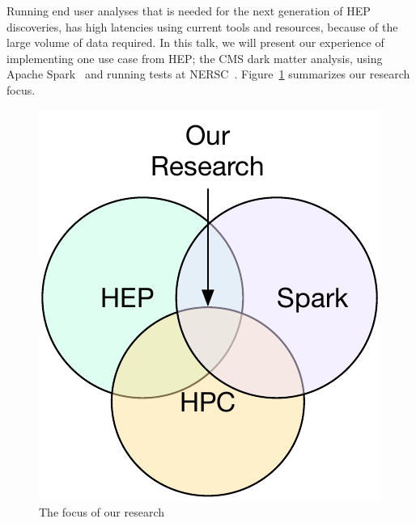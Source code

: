 Running end user analyses that is needed for the next generation of HEP discoveries,  
has high latencies using current tools and resources, because of the large volume of data required. 
In this talk, we will present our
experience of implementing one use case from HEP; the CMS dark matter analysis, using Apache Spark~\cite{spark,spark1} and running tests at NERSC~\cite{nersc-spark}. Figure~\ref{fig:overview} summarizes our research focus. 
\begin{figure}[htbp]
\begin{center}
 \includegraphics[scale=0.5]{overview}
\caption{The focus of our research}
\label{fig:overview}
\end{center}
\end{figure}
\squeezeup
